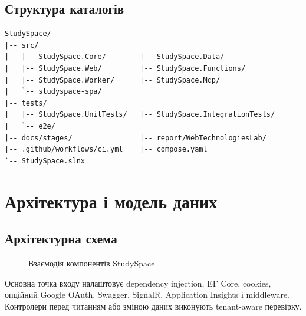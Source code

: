 \documentclass[12pt,a4paper]{article}
\begin{document}
\subsection{Структура каталогів}
\begin{lstlisting}[language={},caption={Скорочена структура}]
StudySpace/
|-- src/
|   |-- StudySpace.Core/        |-- StudySpace.Data/
|   |-- StudySpace.Web/         |-- StudySpace.Functions/
|   |-- StudySpace.Worker/      |-- StudySpace.Mcp/
|   `-- studyspace-spa/
|-- tests/
|   |-- StudySpace.UnitTests/   |-- StudySpace.IntegrationTests/
|   `-- e2e/
|-- docs/stages/                |-- report/WebTechnologiesLab/
|-- .github/workflows/ci.yml    |-- compose.yaml
`-- StudySpace.slnx
\end{lstlisting}

\section{Архітектура і модель даних}
\subsection{Архітектурна схема}
\begin{figure}[H]\centering
{}\caption{Взаємодія компонентів StudySpace}\end{figure}

Основна точка входу налаштовує dependency injection, EF Core, cookies,
опційний Google OAuth, Swagger, SignalR, Application Insights і middleware.
Контролери перед читанням або зміною даних виконують tenant-aware перевірку.
\end{document}

